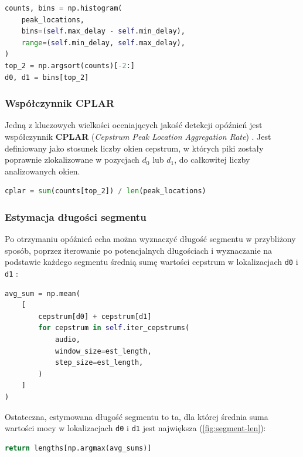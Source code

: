 \begin{lstlisting}[language=Python, caption={Tworzenie histogramu z lokalizacji pików.}]
counts, bins = np.histogram(
    peak_locations,
    bins=(self.max_delay - self.min_delay),
    range=(self.min_delay, self.max_delay),
)
top_2 = np.argsort(counts)[-2:]
d0, d1 = bins[top_2]
\end{lstlisting}

\subsubsection{Współczynnik CPLAR}

Jedną z kluczowych wielkości oceniających jakość detekcji opóźnień jest współczynnik \textbf{CPLAR} (\textit{Cepstrum Peak Location Aggregation Rate}) \cite{echo_swc}. Jest definiowany jako stosunek liczby okien cepstrum, w których piki zostały poprawnie zlokalizowane w pozycjach $d_0$ lub $d_1$, do całkowitej liczby analizowanych okien.

\begin{lstlisting}[language=Python, caption={Obliczanie współczynnika CPLAR.}]
cplar = sum(counts[top_2]) / len(peak_locations)
\end{lstlisting}

\subsubsection{Estymacja długości segmentu}

Po otrzymaniu opóźnień echa można wyznaczyć długość segmentu w przybliżony sposób, poprzez iterowanie po potencjalnych długościach i wyznaczanie na podstawie każdego segmentu średnią sumę wartości cepstrum w lokalizacjach \verb|d0| i \verb|d1| \cite{echo_swc}:

\begin{lstlisting}[language=Python, caption={Średnia z sum wartości pików z każdego segmentu.}]
avg_sum = np.mean(
    [
        cepstrum[d0] + cepstrum[d1]
        for cepstrum in self.iter_cepstrums(
            audio,
            window_size=est_length,
            step_size=est_length,
        )
    ]
)
\end{lstlisting}

Ostateczna, estymowana długość segmentu to ta, dla której średnia suma wartości mocy w lokalizacjach \verb|d0| i \verb|d1| jest największa (\ref{fig:segment-len}):

\begin{lstlisting}[language=Python, caption={Branie długości, której odpowiada średnia suma o maksymalnej wartości}]
return lengths[np.argmax(avg_sums)]
\end{lstlisting}

